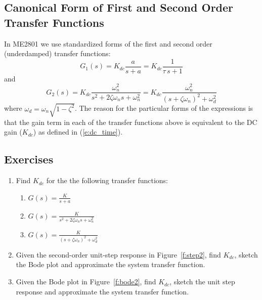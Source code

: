 \documentclass[11pt]{article}
\begin{document}
\subsection{Canonical Form of First and Second Order Transfer Functions}

In ME2801 we use standardized forms of the first and second order (underdamped) transfer functions:
\[
G_1(s) = K_{dc} \frac{a}{s+a} = K_{dc} \frac{1}{\tau \, s + 1}
\]
and
\[G_2(s) = K_{dc} \frac{\omega_n^2}{s^2 + 2 \zeta \omega_n s + \omega_n^2} = K_{dc} \frac{\omega_n^2}{(s+\zeta \omega_n)^2 + \omega_d^2}
\]
where $\omega_d = \omega_n \sqrt{1-\zeta^2}$. The reason for the particular forms of the expressions is that the gain term in each of the transfer functions above is equivalent to the DC gain ($K_{dc}$) as defined in (\ref{e:dc_time}).

\subsection{Exercises}

\begin{enumerate}
\item Find $K_{dc}$ for the the following transfer functions:
  \begin{enumerate}
  \item $\displaystyle G(s) = \frac{K}{s+a}$
  \item $\displaystyle G(s) = \frac{K}{s^2+2 \zeta \omega_n s + \omega_n^2}$
  \item $\displaystyle G(s) = \frac{K}{(s+\zeta \omega_n)^2+\omega_d^2}$
  \end{enumerate}
\item Given the second-order unit-step response in Figure~\ref{f:step2}, find $K_{dc}$, sketch the Bode plot and approximate the system transfer function.
  \item Given the Bode plot in Figure~\ref{f:bode2}, find $K_{dc}$, sketch the unit step response and approximate the system transfer function.
\end{enumerate}
\end{document}
